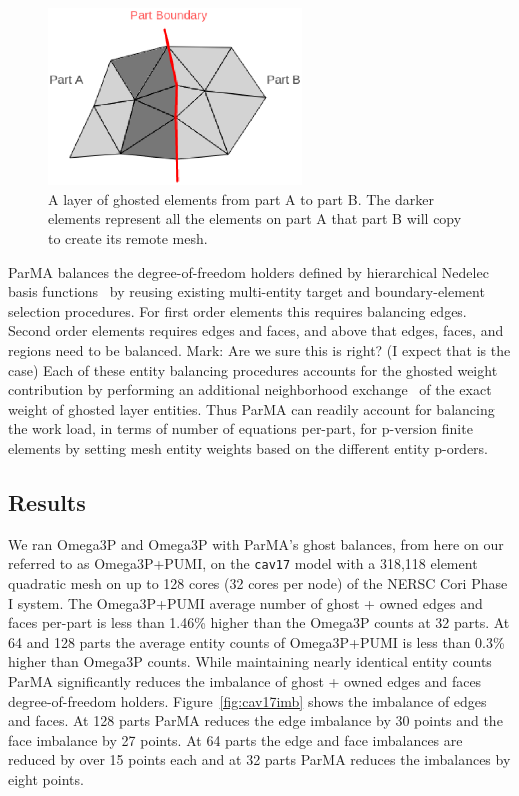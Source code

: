 \documentclass[review,12pt]{elsarticle_summary_report}
\begin{document}
\begin{figure}[ht]
\centering
\includegraphics[width=0.6\textwidth]{ghost.eps} 
\caption{\label{fig:ghost3} A layer of ghosted elements from part A to part B. The darker elements represent all the elements on part A that part B will copy to create its remote mesh.}
\end{figure}

ParMA balances the degree-of-freedom holders defined by 
hierarchical Nedelec basis functions~\cite{ingelstrom2006new,ko2010advances} by
reusing existing multi-entity target and boundary-element selection
procedures.
For first order elements this requires balancing edges.
Second order elements requires edges and faces, and above that edges, faces, and
regions need to be balanced. \color{blue} Mark: Are we sure this is right? (I expect that is the case) \color{black}
Each of these entity balancing procedures accounts for the ghosted weight
contribution by performing an additional neighborhood
exchange~\cite{ibanez2014hybrid} of the exact weight of ghosted layer entities.
Thus ParMA can readily account for balancing the work load, in terms of number
of equations per-part, for p-version finite elements by setting mesh entity
weights based on the different entity p-orders. 

\subsection{\label{load_balance_results} Results}

We ran Omega3P and Omega3P with ParMA's ghost balances, from here on our referred
to as Omega3P+PUMI, on the \texttt{cav17} model with a 318,118
element quadratic mesh on up to 128 cores (32 cores per node) of the NERSC Cori
Phase I system.
The Omega3P+PUMI average number of ghost + owned edges and faces per-part
is less than 1.46\% higher than the Omega3P counts at 32 parts.
At 64 and 128 parts the average entity counts of Omega3P+PUMI is less than 0.3\%
higher than Omega3P counts.
While maintaining nearly identical entity counts ParMA significantly reduces the
imbalance of ghost + owned edges and faces degree-of-freedom holders.
Figure~\ref{fig:cav17imb} shows the imbalance of edges and faces.
At 128 parts ParMA reduces the edge imbalance by 30 points and the face
imbalance by 27 points.
At 64 parts the edge and face imbalances are reduced by over 15 points each and
at 32 parts ParMA reduces the imbalances by eight points.
\end{document}

